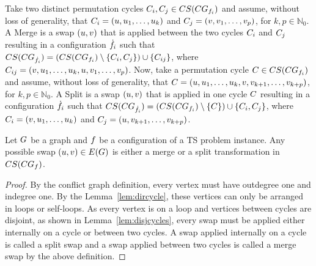 \documentclass[msc]{ppgccufmg}    %
\begin{document}
Take two distinct permutation cycles $C_{i},C_{j} \in CS(CG_{f_{i}})$ and assume, without loss of 
generality, that $C_{i} = (u, u_{1}, \ldots, 
u_{k})$ and $C_{j} = (v, v_{1}, \ldots, 
v_{p})$, for $k,p \in  \mathbb{N}_{0}$.
A Merge is a swap $(u, v)$ that is applied between the
two cycles $C_{i}$ and $C_{j}$ resulting in a configuration 
$\dot{f_{i}}$ such that $CS(CG_{\dot{f_{i}}
}) = (CS(CG_{f_{i}}) \setminus \{C_{i}, C_{j}\}) \cup \{C_{ij}\}$, where $C_{ij} = (v,u_{1},\ldots,u_{k}, u, v_{1}, \ldots, 
v_{p})$.
Now, take a permutation cycle $C \in CS(CG_
{f_{i}})$ and assume, without loss of generality, that $C = 
(u,u_{1},\ldots,u_{k}, v, v_{k+1}, 
\ldots, v_{k+p})$, for $k,p \in \mathbb{N}_{0}$.
A Split is a swap $(u, v)$ that is applied in one cycle 
$C$ resulting in a configuration $\dot{f_{i}}$ such that $CS(CG_{\dot{f_{i}}}) = (CS(
CG_{f_{i}}) \setminus \{C\}) \cup \{C_{i}, 
C_{j}\}$, where $C_{i} = (v, u_{1}, \ldots, 
u_{k})$ and $C_{j} = (u, v_{k+1}, \ldots, 
v_{k+p})$.

\begin{lemma}
\label{lem:allswaps}
Let $G$ be a graph and $f$ be a configuration of a TS problem 
instance.
Any possible swap $(u, v) \in E(G)$ is either a 
merge or a split transformation in $CS(CG_
{f})$.
\end{lemma}

\begin{proof}
By the conflict graph definition, every vertex must have outdegree one and 
indegree one.
By the Lemma~\ref{lem:dircycle}, these vertices can only be arranged in loops 
or self-loops.
As every vertex is on a loop and vertices between cycles are disjoint, as shown
in Lemma~\ref{lem:disjcycles}, every swap must be applied either internally on
a cycle or between two cycles.
A swap applied internally on a cycle is called a split swap and a swap applied
between two cycles is called a merge swap by the above definition.
\end{proof}
\end{document}

